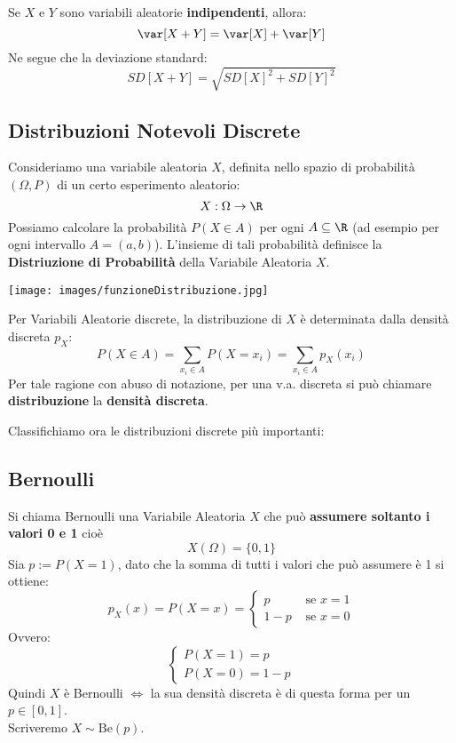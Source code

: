 Se $X$ e $Y$ sono variabili aleatorie \textbf{indipendenti}, allora:
\[
	\var[X+Y] = \var[X] + \var[Y]
\]
Ne segue che la deviazione standard:
\[
	SD[X+Y] = \sqrt{SD[X]^2 + SD[Y]^2}
\]



\subsection{Distribuzioni Notevoli Discrete}
Consideriamo una variabile aleatoria $X$, definita nello spazio di probabilità
$(\Omega, P)$ di un certo esperimento aleatorio:
\[
	X:\Omega \rightarrow \R
\]
Possiamo calcolare la probabilità $P(X \in A)$ per ogni $A \subseteq \R$
(ad esempio per ogni intervallo $A=(a,b)$).
L'insieme di tali probabilità definisce la \textbf{Distriuzione di Probabilità} della Variabile Aleatoria $X$.
\begin{center}
	\texttt{[image: images/funzioneDistribuzione.jpg]}
\end{center}

Per Variabili Aleatorie discrete, la distribuzione di $X$ è determinata dalla densità discreta $p_X$:
\[
	P(X \in A) = \sum_{x_i \in A} P(X=x_i) = \sum_{x_i \in A} p_X(x_i)
\]
Per tale ragione con abuso di notazione, per una v.a. discreta si può chiamare
\textbf{distribuzione} la \textbf{densità discreta}.

Classifichiamo ora le distribuzioni discrete più importanti:

\subsection{Bernoulli}
Si chiama Bernoulli una Variabile Aleatoria $X$ che può \textbf{assumere soltanto i valori 0 e 1} cioè
\[
	X(\Omega) = \{0,1\}
\]
Sia $p:=P(X=1)$, dato che la somma di tutti i valori che può assumere è 1 si ottiene:
\[
	p_X (x) = P(X=x) =
	\begin{cases}
		p   & \text{ se } x=1 \\
		1-p & \text{ se } x=0
	\end{cases}
\]
Ovvero:
\[
	\begin{cases}
		P(X=1) = p \\
		P(X=0)= 1-p
	\end{cases}
\]
Quindi $X$ è Bernoulli $\Leftrightarrow$ la sua densità discreta è di questa
forma per un $p \in [0,1]$.
\\ Scriveremo $X \sim \text{Be}(p)$.

